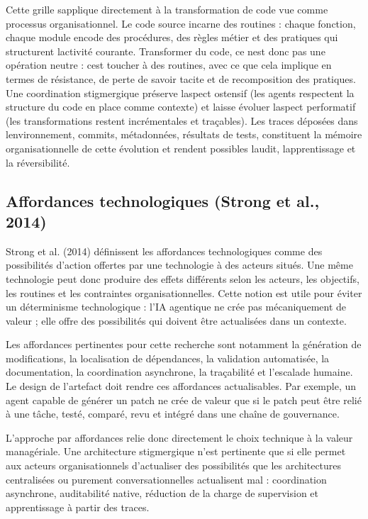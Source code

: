 Cette grille s\textquotesingle applique directement à la transformation
de code vue comme processus organisationnel. Le code source incarne des
routines : chaque fonction, chaque module encode des procédures, des
règles métier et des pratiques qui structurent
l\textquotesingle activité courante. Transformer du code, ce
n\textquotesingle est donc pas une opération neutre : c\textquotesingle est
toucher à des routines, avec ce que cela implique en termes de
résistance, de perte de savoir tacite et de recomposition des pratiques.
Une coordination stigmergique préserve l\textquotesingle aspect ostensif
(les agents respectent la structure du code en place comme contexte) et
laisse évoluer l\textquotesingle aspect performatif (les transformations
restent incrémentales et traçables). Les traces déposées dans
l\textquotesingle environnement, commits, métadonnées, résultats de
tests, constituent la mémoire organisationnelle de cette évolution et
rendent possibles l\textquotesingle audit, l\textquotesingle apprentissage
et la réversibilité.

\subsection{Affordances technologiques (Strong et al., 2014)}

Strong et al. (2014) définissent les affordances technologiques comme des possibilités d'action offertes par une technologie à des acteurs situés. Une même technologie peut donc produire des effets différents selon les acteurs, les objectifs, les routines et les contraintes organisationnelles. Cette notion est utile pour éviter un déterminisme technologique : l'IA agentique ne crée pas mécaniquement de valeur ; elle offre des possibilités qui doivent être actualisées dans un contexte.

Les affordances pertinentes pour cette recherche sont notamment la génération de modifications, la localisation de dépendances, la validation automatisée, la documentation, la coordination asynchrone, la traçabilité et l'escalade humaine. Le design de l'artefact doit rendre ces affordances actualisables. Par exemple, un agent capable de générer un patch ne crée de valeur que si le patch peut être relié à une tâche, testé, comparé, revu et intégré dans une chaîne de gouvernance.

L'approche par affordances relie donc directement le choix technique à la valeur managériale. Une architecture stigmergique n'est pertinente que si elle permet aux acteurs organisationnels d'actualiser des possibilités que les architectures centralisées ou purement conversationnelles actualisent mal : coordination asynchrone, auditabilité native, réduction de la charge de supervision et apprentissage à partir des traces.


